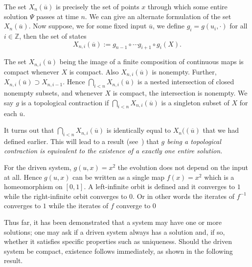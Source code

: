 The set $X_n(\overline{u})$ is precisely the set of points $x$ through which some entire solution $\Psi$ passes at time $n$. We can give an alternate formulation of the set $X_n(\overline{u})$. 
Now suppose, we for some fixed input 
$\overline{u}$, we define $g_i = g(u_i,\cdot)$ for all $i\in \mathbb{Z}$, then the set of states
\begin{equation} \label{eqn_association}
X_{n,i}(\overline{u}) := g_{n-1} \circ \cdots g_{i+1} \circ g_i(X).
\end{equation}

The set $X_{n,i}(\overline{u})$ being the image of a finite composition of
continuous maps is compact whenever $X$ is compact. Also $X_{n,i}(\overline{u})$ is
nonempty.  Further, $X_{n,i}(\overline{u}) \supset X_{n,i-1}$. Hence $\bigcap_{i<n}
X_{n,i}(\overline{u})$ is a nested intersection of closed nonempty subsets, and
whenever $X$ is compact, the intersection is nonempty. We say $g$ is a topological contraction if $\bigcap_{i<n}X_{n,i}(\overline{u})$ is a singleton subset of $X$ for each $\overline{u}$. 

It turns out that $\bigcap_{i<n}X_{n,i}(\overline{u})$ is identically equal to $X_n((\overline{u})$ that we had defined earlier. This will lead to a result (see~\cite{manjunath2013echo}) that \textit{$g$ being a topological contraction is equivalent to the existence of a exactly one entire solution.}


\begin{Remark}
  \label{rem_proofEx} \rm
  For the driven system,  
  $g(u,x)=x^2$ the evolution does not depend on the input at all. Hence $g(u,x)$ can be written as a single map $f(x)=x^2$ which is a homeomorphism on $[0,1]$. A left-infinite orbit is defined and it converges to $1$ while the right-infinite orbit converges to $0$. Or in other words the iterates of $f^{-1}$ converges to $1$ while the iterates of $f$ converge to $0$ 
\end{Remark}

Thus far, it has been demonstrated that a system may have one or more solutions; one may ask if a driven system always has a solution and, if so, whether it satisfies specific properties such as uniqueness. 
Should the driven system be compact, existence follows immediately, as shown in the following result.

